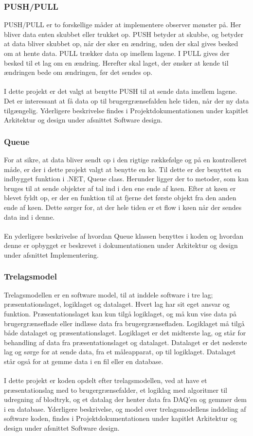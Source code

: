 \subsubsection{PUSH/PULL}
PUSH/PULL er to forskellige måder at implementere observer mønster på. Her bliver data enten skubbet eller trukket op. PUSH betyder at skubbe, og betyder at data bliver skubbet op, når der sker en ændring, uden der skal gives besked om at hente data. PULL trækker data op imellem lagene. I PULL gives der besked til et lag om en ændring. Herefter skal laget, der ønsker at kende til ændringen bede om ændringen, før det sendes op.\\
\\
I dette projekt er det valgt at benytte PUSH til at sende data imellem lagene. Det er interessant at få data op til brugergrænsefalden hele tiden, når der ny data tilgængelig. Yderligere beskrivelse findes i Projektdokumentationen under kapitlet Arkitektur og design under afsnittet Software design. 
\subsubsection{Queue}
For at sikre, at data bliver sendt op i den rigtige rækkefølge og på en kontrolleret måde, er der i dette projekt valgt at benytte en kø. Til dette er der benyttet en indbygget funktion i .NET, Queue class. Herunder ligger der to metoder, som kan bruges til at sende objekter af tal ind i den ene ende af køen. Efter at køen er blevet fyldt op, er der en funktion til at fjerne det første objekt fra den anden ende af køen. Dette sørger for, at der hele tiden er et flow i køen når der sendes data ind i denne. \\
\\
En yderligere beskrivelse af hvordan Queue klassen benyttes i koden og hvordan denne er opbygget er beskrevet i dokumentationen under Arkitektur og design under afsnittet Implementering.
\subsubsection{Trelagsmodel}
Trelagsmodellen er en software model, til at inddele software i tre lag; præsentationslaget, logiklaget og datalaget. Hvert lag har sit eget ansvar og funktion. Præsentationslaget kan kun tilgå logiklaget, og må kun vise data på brugergrænseflade eller indlæse data fra brugergrænsefladen. Logiklaget må tilgå både datalaget og præsentationslaget. Logiklaget er det midterste lag, og står for behandling af data fra præsentationslaget og datalaget. Datalaget er det nederste lag og sørge for at sende data, fra et måleapparat, op til logiklaget. Datalaget står også for at gemme data i en fil eller en database.\\
\\ 
I dette projekt er koden opdelt efter trelagsmodellen, ved at have et præsentationslag med to brugergrænsefalder, et logiklag med algoritmer til udregning af blodtryk, og et datalag der henter data fra DAQ’en og gemmer dem i en database. Yderligere beskrivelse, og model over trelagsmodellens inddeling af software koden, findes i Projektdokumentationen under kapitlet Arkitektur og design under afsnittet Software design.
